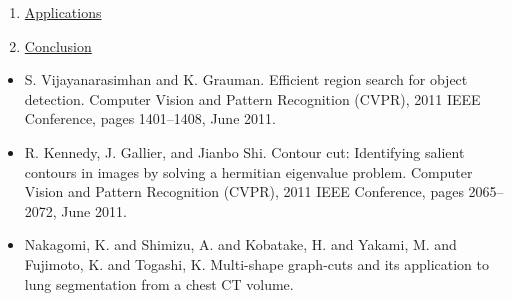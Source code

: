 \documentclass[11pt, a4paper, landscape]{article}
\begin{document}
\begin{enumerate}
\item \hyperlink{sli:application}{Applications}
\item \hyperlink{sli:conclusion}{Conclusion}
\end{enumerate}
\vfill


\NewPage{} 
\vfill 
\begin{itemize}
\item S. Vijayanarasimhan and K. Grauman. \alert{Efficient region search for object detection.} Computer Vision and Pattern Recognition (CVPR), 2011 IEEE Conference, pages 1401--1408, June 2011.
\item R. Kennedy, J. Gallier, and Jianbo Shi. \alert{Contour cut: Identifying salient contours in images
by solving a hermitian eigenvalue problem.} Computer Vision and Pattern Recognition (CVPR), 2011 IEEE Conference, pages 2065--2072, June 2011.
\item Nakagomi, K. and Shimizu, A. and Kobatake, H. and Yakami, M. and Fujimoto, K. and Togashi, K. \alert{Multi-shape graph-cuts and its application to lung segmentation from a chest CT volume.}
\end{itemize}
\vfill
\end{document}
